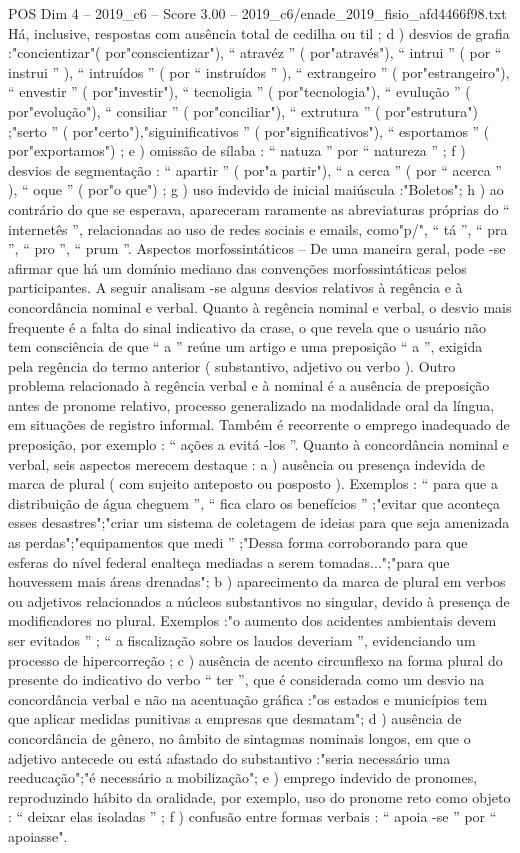 \begin{textsample}{POS Dim 4 – 2019\_c6 – Score 3.00 – 2019\_c6/enade\_2019\_fisio\_afd4466f98.txt}
Há, inclusive, respostas com ausência total de cedilha ou til ; d ) desvios de grafia :"concientizar"( por"conscientizar"), “ atravéz ” ( por"através"), “ intrui ” ( por “ instrui ” ), “ intruídos ” ( por “ instruídos ” ), “ extrangeiro ” ( por"estrangeiro"), “ envestir ” ( por"investir"), “ tecnoligia ” ( por"tecnologia"), “ evulução ” ( por"evolução"), “ consiliar ” ( por"conciliar"), “ extrutura ” ( por"estrutura") ;"serto ” ( por"certo"),"siguinificativos ” ( por"significativos"), “ esportamos ” ( por"exportamos") ; e ) omissão de sílaba : “ natuza ” por “ natureza ” ; f ) desvios de segmentação : “ apartir ” ( por"a partir"), “ a cerca ” ( por “ acerca ” ), “ oque ” ( por"o que") ; g ) uso indevido de inicial maiúscula :"Boletos"; h ) ao contrário do que se esperava, apareceram raramente as abreviaturas próprias do “ internetês ”, relacionadas ao uso de redes sociais e emails, como"p/", “ tá ”, “ pra ”, “ pro ”, “ prum ”.
Aspectos morfossintáticos – De uma maneira geral, pode -se afirmar que há um domínio mediano das convenções morfossintáticas pelos participantes.
A seguir analisam -se alguns desvios relativos à regência e à concordância nominal e verbal.
Quanto à regência nominal e verbal, o desvio mais frequente é a falta do sinal indicativo da crase, o que revela que o usuário não tem consciência de que “ a ” reúne um artigo e uma preposição “ a ”, exigida pela regência do termo anterior ( substantivo, adjetivo ou verbo ).
Outro problema relacionado à regência verbal e à nominal é a ausência de preposição antes de pronome relativo, processo generalizado na modalidade oral da língua, em situações de registro informal.
Também é recorrente o emprego inadequado de preposição, por exemplo : “ ações a evitá -los ”.
Quanto à concordância nominal e verbal, seis aspectos merecem destaque : a ) ausência ou presença indevida de marca de plural ( com sujeito anteposto ou posposto ).
Exemplos : “ para que a distribuição de água cheguem ”, “ fica claro os benefícios ” ;"evitar que aconteça esses desastres";"criar um sistema de coletagem de ideias para que seja amenizada as perdas";"equipamentos que medi ” ;"Dessa forma corroborando para que esferas do nível federal enalteça mediadas a serem tomadas...";"para que houvessem mais áreas drenadas"; b ) aparecimento da marca de plural em verbos ou adjetivos relacionados a núcleos substantivos no singular, devido à presença de modificadores no plural.
Exemplos :"o aumento dos acidentes ambientais devem ser evitados ” ; “ a fiscalização sobre os laudos deveriam ”, evidenciando um processo de hipercorreção ; c ) ausência de acento circunflexo na forma plural do presente do indicativo do verbo “ ter ”, que é considerada como um desvio na concordância verbal e não na acentuação gráfica :"os estados e municípios tem que aplicar medidas punitivas a empresas que desmatam"; d ) ausência de concordância de gênero, no âmbito de sintagmas nominais longos, em que o adjetivo antecede ou está afastado do substantivo :"seria necessário uma reeducação";"é necessário a mobilização"; e ) emprego indevido de pronomes, reproduzindo hábito da oralidade, por exemplo, uso do pronome reto como objeto : “ deixar elas isoladas ” ; f ) confusão entre formas verbais : “ apoia -se ” por “ apoiasse".

\end{textsample}
